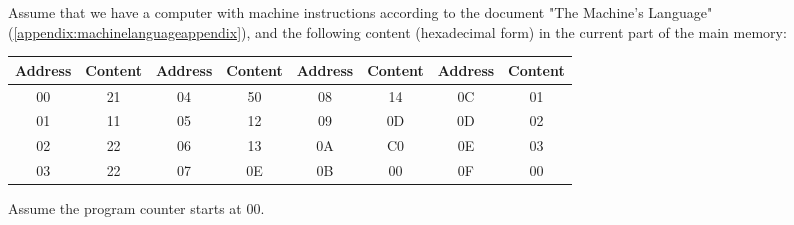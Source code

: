 Assume that we have a computer with machine instructions according to the document "The Machine's Language" (\autoref{appendix:machinelanguageappendix}), and the following content (hexadecimal form) in the current part of the main memory:

\begin{center}
\begin{tabular}{|c|c|c|c|c|c|c|c|}
\hline
\textbf{Address} & \textbf{Content} & \textbf{Address} & \textbf{Content} & \textbf{Address} & \textbf{Content} & \textbf{Address} & \textbf{Content} \\
\hline
00 & 21 & 04 & 50 & 08 & 14 & 0C & 01 \\
01 & 11 & 05 & 12 & 09 & 0D & 0D & 02 \\
02 & 22 & 06 & 13 & 0A & C0 & 0E & 03 \\
03 & 22 & 07 & 0E & 0B & 00 & 0F & 00 \\
\hline
\end{tabular}
\end{center}

Assume the program counter starts at 00.
